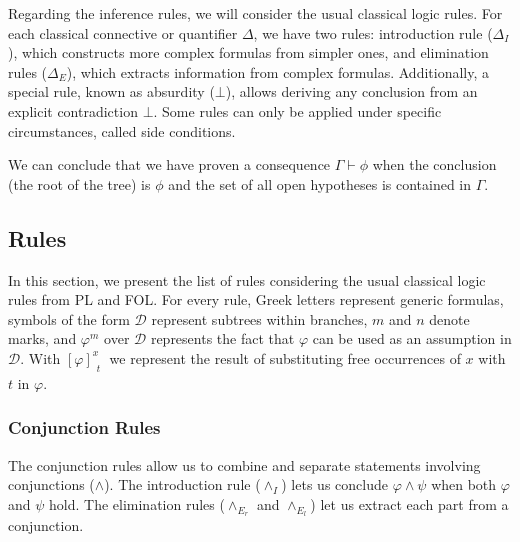 Regarding the inference rules, we will consider the usual classical logic rules. For each classical connective or quantifier $\Delta$, we have two rules: introduction rule ($\Delta_I$), which constructs more complex formulas from simpler ones, and elimination rules ($\Delta_E$), which extracts information from complex formulas. Additionally, a special rule, known as absurdity (\(\bot\)), allows deriving any conclusion from an explicit contradiction $\bot$. Some rules can only be applied under specific circumstances, called side conditions.

We can conclude that we have proven a consequence \(\Gamma \vdash \phi\) when the conclusion (the root of the tree) is \(\phi\) and the set of all open hypotheses is contained in \(\Gamma\).

\subsection{Rules}
\label{nd:rules} 
In this section, we present the list of rules considering the usual classical logic rules from \gls{PL} and \gls{FOL}. For every rule, Greek letters represent generic formulas, symbols of the form \( \mathcal{D} \) represent subtrees within branches, \( m \) and \( n \) denote marks, and \(\displaystyle \varphi^m\) over \( \mathcal{D} \) represents the fact that $\varphi$ can be used as an assumption in \( \mathcal{D} \). With \(\displaystyle \left[ \varphi \right]^x_{\substack{t}}\) we represent the result of substituting free occurrences of $x$ with $t$ in $\varphi$.%

\subsubsection*{Conjunction Rules}

The conjunction rules allow us to combine and separate statements involving conjunctions (\(\land\)). The introduction rule (\(\land_I\)) lets us conclude \(\varphi \land \psi\) when both \(\varphi\) and \(\psi\) hold. The elimination rules (\(\land_{E_r}\) and \(\land_{E_l}\)) let us extract each part from a conjunction.

\vspace{0.5cm}

